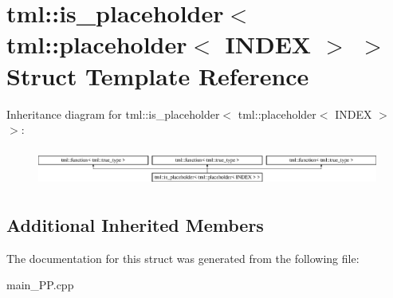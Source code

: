 \hypertarget{structtml_1_1is__placeholder_3_01tml_1_1placeholder_3_01INDEX_01_4_01_4}{\section{tml\+:\+:is\+\_\+placeholder$<$ tml\+:\+:placeholder$<$ I\+N\+D\+E\+X $>$ $>$ Struct Template Reference}
\label{structtml_1_1is__placeholder_3_01tml_1_1placeholder_3_01INDEX_01_4_01_4}
}
Inheritance diagram for tml\+:\+:is\+\_\+placeholder$<$ tml\+:\+:placeholder$<$ I\+N\+D\+E\+X $>$ $>$\+:\begin{figure}[H]
\begin{center}
\leavevmode
\includegraphics[height=1.252796cm]{structtml_1_1is__placeholder_3_01tml_1_1placeholder_3_01INDEX_01_4_01_4}
\end{center}
\end{figure}
\subsection*{Additional Inherited Members}


The documentation for this struct was generated from the following file\+:\begin{DoxyCompactItemize}
\item 
main\+\_\+\+P\+P.\+cpp\end{DoxyCompactItemize}
